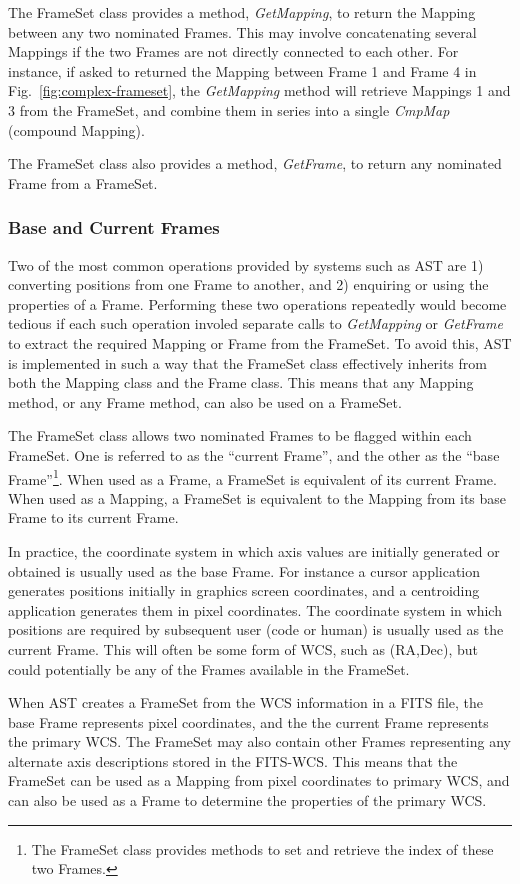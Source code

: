 \documentclass[final,authoryear,5p,times,twocolumn]{elsarticle}
\begin{document}
The FrameSet class provides a method, \emph{GetMapping}, to return the
Mapping between any two nominated Frames. This may involve concatenating
several Mappings if the two Frames are not directly connected to each
other. For instance, if asked to returned the Mapping between Frame 1 and
Frame 4 in Fig.~\ref{fig:complex-frameset}, the \emph{GetMapping} method
will retrieve Mappings 1 and 3 from the FrameSet, and combine them in
series into a single \emph{CmpMap} (compound Mapping).

The FrameSet class also provides a method, \emph{GetFrame}, to
return any nominated Frame from a FrameSet.

\subsubsection{Base and Current Frames}
Two of the most common operations provided by systems such as AST are 1)
converting positions from one Frame to another, and 2) enquiring or using
the properties of a Frame. Performing these two operations repeatedly
would become tedious if each such operation involed separate calls to
\emph{GetMapping} or \emph{GetFrame} to extract the required Mapping or
Frame from the FrameSet. To avoid this, AST is implemented in such a way
that the FrameSet class effectively inherits from both the Mapping class
and the Frame class. This means that any Mapping method, or any Frame
method, can also be used on a FrameSet.

The FrameSet class allows two nominated Frames to be flagged within each
FrameSet. One is referred to as the ``current Frame'', and the other as
the ``base Frame''\footnote{The FrameSet class provides methods to set
and retrieve the index of these two Frames.}. When used as a Frame, a
FrameSet is equivalent of its current Frame. When used as a Mapping, a
FrameSet is equivalent to the Mapping from its base Frame to its current
Frame.

In practice, the coordinate system in which axis values are initially
generated or obtained is usually used as the base Frame. For instance a
cursor application generates positions initially in graphics screen
coordinates, and a centroiding application generates them in pixel
coordinates.  The coordinate system in which positions are required by
subsequent user (code or human) is usually used as the current Frame. This
will often be some form of WCS, such as (RA,Dec), but could potentially
be any of the Frames available in the FrameSet.

When AST creates a FrameSet from the WCS information in a FITS file, the
base Frame represents pixel coordinates, and the the current Frame
represents the primary WCS. The FrameSet may also contain other Frames
representing any alternate axis descriptions stored in the FITS-WCS.
This means that the FrameSet can be used as a Mapping from pixel
coordinates to primary WCS, and can also be used as a Frame to determine
the properties of the primary WCS.
\end{document}

